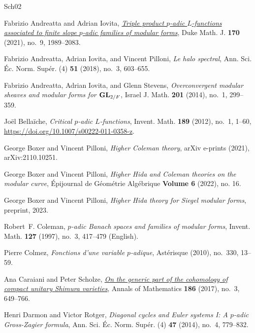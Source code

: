 \documentclass[10pt, oneside]{amsart}
\numberwithin{equation}{subsection}
\theoremstyle{definition}
\theoremstyle{remark}
\begin{document}
\begin{thebibliography}{{Sch}02}

Fabrizio Andreatta and Adrian Iovita,
  \emph{\href{https://doi.org/10.1215/00127094-2020-0076}{Triple product
  {$p$}-adic {$L$}-functions associated to finite slope {$p$}-adic families of
  modular forms}}, Duke Math. J. \textbf{170} (2021), no.~9, 1989--2083.

Fabrizio Andreatta, Adrian Iovita, and Vincent Pilloni, \emph{Le halo
  spectral}, Ann. Sci. \'{E}c. Norm. Sup\'{e}r. (4) \textbf{51} (2018), no.~3,
  603--655. 

Fabrizio Andreatta, Adrian Iovita, and Glenn Stevens, \emph{Overconvergent
  modular sheaves and modular forms for {${\bf GL}_{2/F}$}}, Israel J. Math.
  \textbf{201} (2014), no.~1, 299--359.

Jo\"{e}l Bella\"{i}che, \emph{Critical {$p$}-adic {$L$}-functions}, Invent.
  Math. \textbf{189} (2012), no.~1, 1--60,
  \url{https://doi.org/10.1007/s00222-011-0358-z}. 

George {Boxer} and Vincent {Pilloni}, \emph{{Higher Coleman theory}}, arXiv
  e-prints (2021), arXiv:2110.10251.

George Boxer and Vincent Pilloni, \emph{{Higher Hida and Coleman theories on
  the modular curve}}, {Épijournal de Géométrie Algébrique} \textbf{{Volume
  6}} (2022), no. 16.

George {Boxer} and Vincent {Pilloni}, \emph{{Higher Hida theory for Siegel
  modular forms}}, preprint, 2023.

Robert~F. Coleman, \emph{{{\(p\)}}-adic {Banach} spaces and families of modular
  forms}, Invent. Math. \textbf{127} (1997), no.~3, 417--479 (English).

Pierre Colmez, \emph{Fonctions d'une variable {$p$}-adique}, Ast\'{e}risque
  (2010), no.~330, 13--59. 

Ana Caraiani and Peter Scholze,
  \emph{\href{http://www.jstor.org/stable/26395700}{On the generic part of the
  cohomology of compact unitary {S}himura varieties}}, Annals of Mathematics
  \textbf{186} (2017), no.~3, 649--766.

Henri Darmon and Victor Rotger, \emph{Diagonal cycles and {E}uler systems {I}:
  {A} {$p$}-adic {G}ross-{Z}agier formula}, Ann. Sci. \'{E}c. Norm. Sup\'{e}r.
  (4) \textbf{47} (2014), no.~4, 779--832. 


\end{thebibliography}
\end{document}
